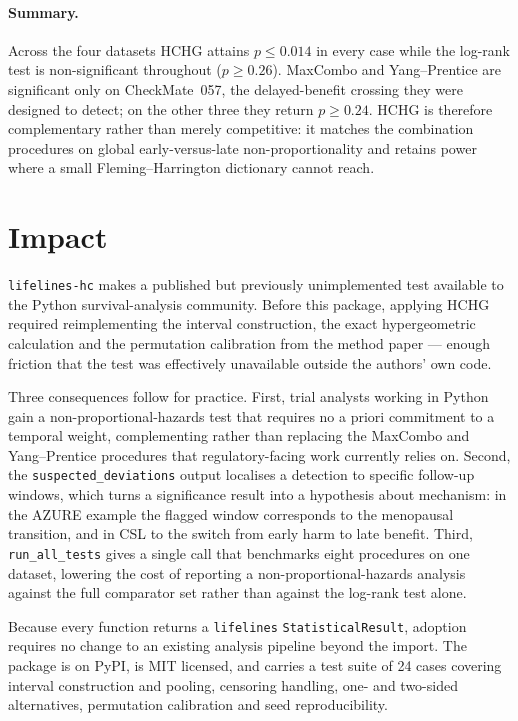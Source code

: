 \documentclass[11pt]{article}
\begin{document}
\paragraph{Summary.}
Across the four datasets HCHG attains $p \leq 0.014$ in every case while the
log-rank test is non-significant throughout ($p \geq 0.26$). MaxCombo and
Yang--Prentice are significant only on CheckMate~057, the delayed-benefit
crossing they were designed to detect; on the other three they return
$p \geq 0.24$. HCHG is therefore complementary rather than merely
competitive: it matches the combination procedures on global
early-versus-late non-proportionality and retains power where a small
Fleming--Harrington dictionary cannot reach.

\section{Impact}

\texttt{lifelines-hc} makes a published but previously unimplemented test
available to the Python survival-analysis community. Before this package,
applying HCHG required reimplementing the interval construction, the exact
hypergeometric calculation and the permutation calibration from the
method paper --- enough friction that the test was effectively unavailable
outside the authors' own code.

Three consequences follow for practice. First, trial analysts working in
Python gain a non-proportional-hazards test that requires no a priori
commitment to a temporal weight, complementing rather than replacing the
MaxCombo and Yang--Prentice procedures that regulatory-facing work
currently relies on. Second, the \texttt{suspected\_deviations} output
localises a detection to specific follow-up windows, which turns a
significance result into a hypothesis about mechanism: in the AZURE example
the flagged window corresponds to the menopausal transition, and in CSL to
the switch from early harm to late benefit. Third, \texttt{run\_all\_tests}
gives a single call that benchmarks eight procedures on one dataset,
lowering the cost of reporting a non-proportional-hazards analysis against
the full comparator set rather than against the log-rank test alone.

Because every function returns a \texttt{lifelines}
\texttt{StatisticalResult}, adoption requires no change to an existing
analysis pipeline beyond the import. The package is on PyPI, is MIT
licensed, and carries a test suite of 24 cases covering interval
construction and pooling, censoring handling, one- and two-sided
alternatives, permutation calibration and seed reproducibility.
\end{document}
